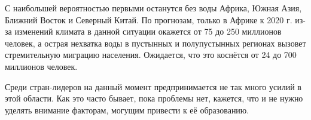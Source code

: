 \begin{enumerate}
		  С наибольшей вероятностью первыми останутся без воды Африка, Южная Азия, Ближний Восток и Северный Китай. По прогнозам, только в Африке к 2020 г. из-за изменений климата в данной ситуации окажется от 75 до 250 миллионов человек, а острая нехватка воды в пустынных и полупустынных регионах вызовет стремительную миграцию населения. Ожидается, что это коснётся от 24 до 700 миллионов человек.
		  
		  Среди стран-лидеров на данный момент предпринимается не так много усилий в этой области. Как это часто бывает, пока проблемы нет, кажется, что и не нужно уделять внимание факторам, могущим привести к её образованию. 
\end{enumerate}